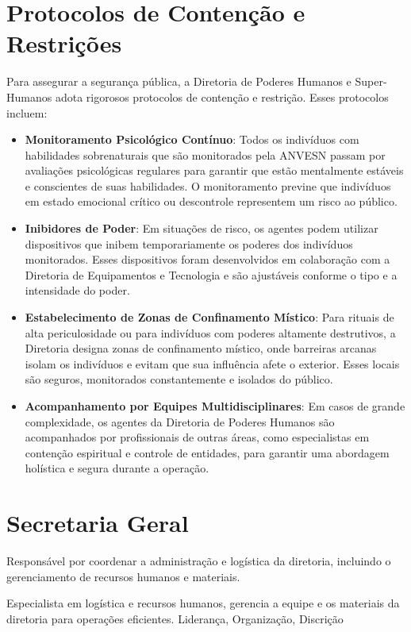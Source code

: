 \section{Protocolos de Contenção e Restrições}
Para assegurar a segurança pública, a Diretoria de Poderes Humanos e Super-Humanos adota rigorosos protocolos de contenção e restrição. Esses protocolos incluem:

\begin{itemize}
    \item \textbf{Monitoramento Psicológico Contínuo}: Todos os indivíduos com habilidades sobrenaturais que são monitorados pela ANVESN passam por avaliações psicológicas regulares para garantir que estão mentalmente estáveis e conscientes de suas habilidades. O monitoramento previne que indivíduos em estado emocional crítico ou descontrole representem um risco ao público.
    \item \textbf{Inibidores de Poder}: Em situações de risco, os agentes podem utilizar dispositivos que inibem temporariamente os poderes dos indivíduos monitorados. Esses dispositivos foram desenvolvidos em colaboração com a Diretoria de Equipamentos e Tecnologia e são ajustáveis conforme o tipo e a intensidade do poder.
    \item \textbf{Estabelecimento de Zonas de Confinamento Místico}: Para rituais de alta periculosidade ou para indivíduos com poderes altamente destrutivos, a Diretoria designa zonas de confinamento místico, onde barreiras arcanas isolam os indivíduos e evitam que sua influência afete o exterior. Esses locais são seguros, monitorados constantemente e isolados do público.
    \item \textbf{Acompanhamento por Equipes Multidisciplinares}: Em casos de grande complexidade, os agentes da Diretoria de Poderes Humanos são acompanhados por profissionais de outras áreas, como especialistas em contenção espiritual e controle de entidades, para garantir uma abordagem holística e segura durante a operação.
\end{itemize}




\section{Secretaria Geral}
Responsável por coordenar a administração e logística da diretoria, incluindo o gerenciamento de recursos humanos e materiais.

{Especialista em logística e recursos humanos, gerencia a equipe e os materiais da diretoria para operações eficientes.}
{Liderança, Organização, Discrição}

